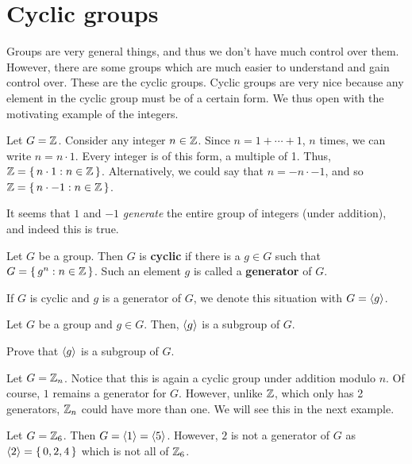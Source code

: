 \documentclass[./main.tex]{subfiles}
\begin{document}
\section{Cyclic groups}
Groups are very general things, and thus we don't have much control over them.
However, there are some groups which are much easier to understand and gain
control over. These are the cyclic groups. Cyclic groups are very nice because
any element in the cyclic group must be of a certain form. We thus open with the
motivating example of the integers. 
\begin{example}
    Let $G = \mathbb{Z}$. Consider any integer $n \in \mathbb{Z}$. Since $n = 1 + \cdots + 1$,
    $n$ times, we can write $n = n \cdot 1$. Every integer is of this form, a
    multiple of 1. Thus, $\mathbb{Z} = \set{n \cdot 1 : n \in \mathbb{Z}}$. Alternatively, we
    could say that $n = -n \cdot -1$, and so $\mathbb{Z} = \set{n \cdot -1: n \in
    \mathbb{Z}}$. 
\end{example}
It seems that $1$ and $-1$ \emph{generate} the entire group of integers (under
addition), and indeed this is true. 

\begin{definition}
    Let $G$ be a group. Then $G$ is \textbf{cyclic} if there is a $g \in G$ such
    that $G = \set{g^n : n \in \mathbb{Z}}$. Such an element $g$ is called a
    \textbf{generator} of $G$.
\end{definition}
If $G$ is cyclic and $g$ is a generator of $G$, we denote this situation with $G =
{ \langle g \rangle }$. 

\begin{example}
    Let $G$ be a group and $g \in G$. Then, ${ \langle g \rangle }$ is a subgroup of $G$.
\end{example}
\begin{exercise}
    Prove that ${ \langle g \rangle }$ is a subgroup of $G$.
\end{exercise}

\begin{example}
    Let $G = \mathbb{Z}_n$. Notice that this is again a cyclic group under addition
    modulo $n$. Of course, $1$ remains a generator for $G$. However, unlike
    $\mathbb{Z}$, which only has 2 generators, $\mathbb{Z}_n$ could have more than one. We
    will see this in the next example.
\end{example}

\begin{example}
    Let $G = \mathbb{Z}_6$. Then $G = { \langle 1 \rangle } = { \langle 5 \rangle }$. However, $2$ is not a
    generator of $G$ as ${ \langle 2 \rangle } = \set{0, 2, 4}$ which is not all of $\mathbb{Z}_6$.
\end{example}
\end{document}
